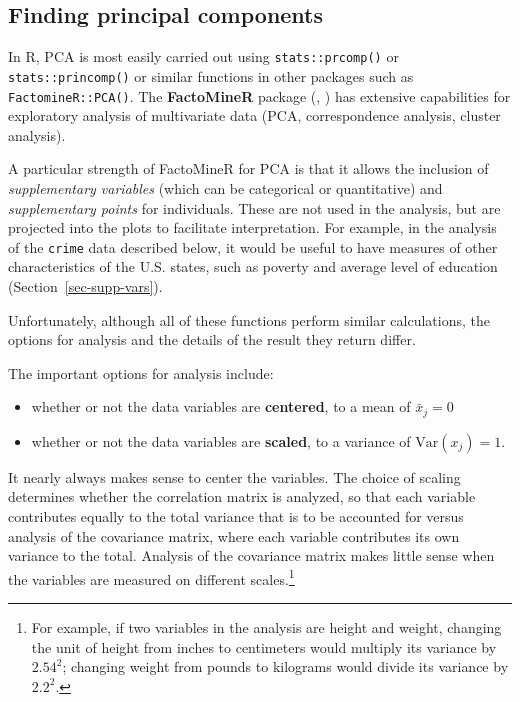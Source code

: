 \documentclass[
  letterpaper,
  10pt,
  krantz2]{krantz}
\providecommand{\tightlist}{%
  \setlength{\itemsep}{0pt}\setlength{\parskip}{0pt}}\usepackage{longtable,booktabs,array}
\begin{document}
{\subsection{Finding principal
components}\label{finding-principal-components}

In R, PCA is most easily carried out using \texttt{stats::prcomp()} or
\texttt{stats::princomp()} or similar functions in other packages such
as \texttt{FactomineR::PCA()}. The \textbf{FactoMineR} package
(,
) has extensive capabilities for
exploratory analysis of multivariate data (PCA, correspondence analysis,
cluster analysis).

A particular strength of FactoMineR for PCA is that it allows the
inclusion of \emph{supplementary variables} (which can be categorical or
quantitative) and \emph{supplementary points} for individuals. These are
not used in the analysis, but are projected into the plots to facilitate
interpretation. For example, in the analysis of the \texttt{crime} data
described below, it would be useful to have measures of other
characteristics of the U.S. states, such as poverty and average level of
education (Section~\ref{sec-supp-vars}).

Unfortunately, although all of these functions perform similar
calculations, the options for analysis and the details of the result
they return differ.

The important options for analysis include:

\begin{itemize}
\tightlist
\item
  whether or not the data variables are \textbf{centered}, to a mean of
  \(\bar{x}_j =0\)
\item
  whether or not the data variables are \textbf{scaled}, to a variance
  of \(\text{Var}(x_j) =1\).
\end{itemize}

It nearly always makes sense to center the variables. The choice of
scaling determines whether the correlation matrix is analyzed, so that
each variable contributes equally to the total variance that is to be
accounted for versus analysis of the covariance matrix, where each
variable contributes its own variance to the total. Analysis of the
covariance matrix makes little sense when the variables are measured on
different scales.\footnote{For example, if two variables in the analysis
  are height and weight, changing the unit of height from inches to
  centimeters would multiply its variance by \(2.54^2\); changing weight
  from pounds to kilograms would divide its variance by \(2.2^2\).}

}
\end{document}
